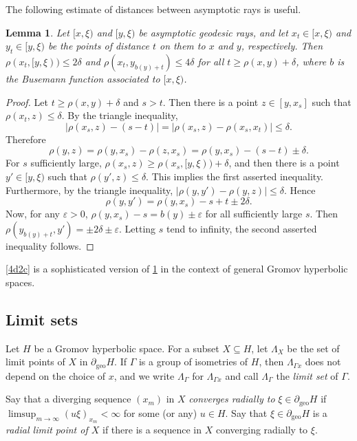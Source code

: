\documentclass[12pt,a4paper]{amsart}
\numberwithin{equation}{section}
\newtheorem{lem}[equation]{Lemma}
\theoremstyle{definition}
\DeclareMathOperator{\geo}{geo}
\def\ve{\varepsilon}
\begin{document}
The following estimate of distances between asymptotic rays is useful.

\begin{lem}\label{asym}
Let $[x,\xi)$ and $[y,\xi)$ be asymptotic geodesic rays, and let $x_t\in[x,\xi)$ and $y_t\in[y,\xi)$ be the points of distance $t$ on them to $x$ and $y$, respectively.
Then $\rho(x_t,[y,\xi))\le2\delta$ and $\rho(x_t,y_{b(y)+t})\le4\delta$ for all $t\ge \rho(x,y)+\delta$, where $b$ is the Busemann function associated to $[x,\xi)$.
\end{lem}

\begin{proof}
Let $t\ge \rho(x,y)+\delta$ and $s>t$.
Then there is a point $z\in[y,x_s]$ such that $\rho(x_t,z)\le\delta$.
By the triangle inequality, \[ |\rho(x_s,z)-(s-t)| = |\rho(x_s,z)-\rho(x_s,x_t)| \le \delta.\]
Therefore \[ \rho(y,z) = \rho(y,x_s) - \rho(z,x_s) = \rho(y,x_s) - (s-t) \pm \delta. \]
For $s$ sufficiently large, $\rho(x_s,z)\ge \rho(x_s,[y,\xi)) + \delta$, and then there is a point $y'\in[y,\xi)$ such that $\rho(y' ,z)\le\delta$.
This implies the first asserted inequality.
Furthermore, by the triangle inequality, $|\rho(y,y')-\rho(y,z)|\le\delta$.
Hence \[ \rho(y,y') =  \rho(y,x_s) - s + t \pm 2\delta.\]
Now, for any $\ve>0$, $\rho(y,x_s) - s = b(y) \pm \ve$ for all sufficiently large $s$.
Then $\rho(y_{b(y)+t},y')=\pm 2\delta\pm\ve$.
Letting $s$ tend to infinity, the second asserted inequality follows.
\end{proof}

\cref{4d2c} is a sophisticated version of \cref{asym} in the context of general Gromov hyperbolic spaces.

\subsection{Limit sets}\label{subseclim}
Let $H$ be a Gromov hyperbolic space.
For a subset $X\subseteq H$, let $\Lambda_X$ be the set of limit points of $X$ in $\partial_{\geo}H$.
If $\Gamma$ is a group of isometries of $H$, then $\Lambda_{\Gamma x}$ does not depend on the choice of $x$, and we write $\Lambda_\Gamma$ for $\Lambda_{\Gamma x}$ and call $\Lambda_\Gamma$ the \emph{limit set} of $\Gamma$.

Say that a diverging sequence $(x_m)$ in $X$ \emph{converges radially to} $\xi\in\partial_{\geo}H$ if $\limsup_{m\to\infty}(u\xi)_{x_m}<\infty$ for some (or any) $u\in H$.
Say that $\xi\in\partial_{\geo}H$ is a \emph{radial limit point of $X$} if there is a sequence in $X$ converging radially to $\xi$.
\end{document}
